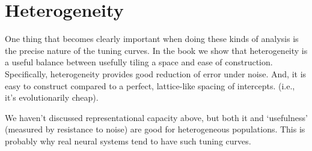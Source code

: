 \documentclass[10pt,letterpaper,oneside]{article}
\begin{document}
\section{Heterogeneity}

One thing that becomes clearly important when doing these kinds of
analysis is the precise nature of the tuning curves. In the book we
show that heterogeneity is a useful balance between usefully tiling
a space and ease of construction. Specifically, heterogeneity provides good reduction of error under
noise. And, it is easy to construct compared to a perfect,
lattice-like spacing of intercepts. (i.e., it's evolutionarily cheap).

We haven't discussed representational capacity above, but both it and
`usefulness' (measured by resistance to noise) are good for heterogeneous
populations. This is probably why real neural systems tend to have
such tuning curves.

\printbibliography
\end{document}
